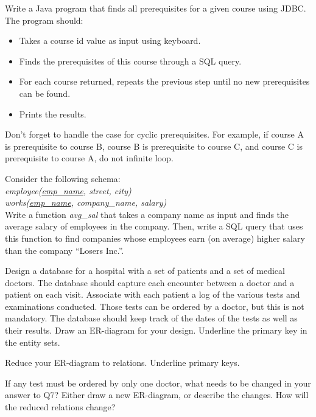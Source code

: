 \documentclass[a4 paper]{article}
\begin{document}
Write a Java program that finds all prerequisites for a given course using JDBC. The program should:
\begin{itemize}
 \item Takes a course id value as input using keyboard.
 \item Finds the prerequisites of this course through a SQL query.
 \item For each course returned, repeats the previous step until no new prerequisites can be found.
 \item Prints the results.
\end{itemize}
Don't forget to handle the case for cyclic prerequisites. For example, if course A is prerequisite to course B, course B is prerequisite to course C, and course C is prerequisite to course A, do not infinite loop.


Consider the following schema:\\
\emph{employee(\underline{emp\_name}, street, city)}\\
\emph{works(\underline{emp\_name}, company\_name, salary)}\\
Write a function \emph{avg\_sal} that takes a company name as input and finds the average salary of employees in the company. Then, write a SQL query that uses this function to find companies whose employees earn (on average) higher salary than the company ``Losers Inc.''.

Design a database for a hospital with a set of patients and a set of medical doctors. The database should capture each encounter between a doctor and a patient on each visit. Associate with each patient a log of the various tests and examinations conducted. Those tests can be ordered by a doctor, but this is not mandatory. The database should keep track of the dates of the tests as well as their results. Draw an ER-diagram for your design. Underline the primary key in the entity sets.


Reduce your ER-diagram to relations. Underline primary keys.



If any test must be ordered by only one doctor, what needs to be changed in your answer to Q7? Either draw a new ER-diagram, or describe the changes. How will the reduced relations change?
\end{document}
